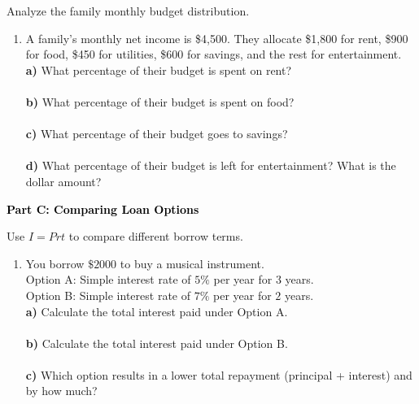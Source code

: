 \documentclass[12pt, letterpaper, fleqn]{article}
\newcommand{\blanklong}{\underline{\hspace{6.5cm}}}
\begin{document}
\noindent
Analyze the family monthly budget distribution.

\vspace{5mm}

\begin{enumerate}[itemsep=2.5cm, leftmargin=0.6cm]
\item A family's monthly net income is \$4,500. They allocate \$1,800 for rent, \$900 for food, \$450 for utilities, \$600 for savings, and the rest for entertainment. \\
\textbf{a)} What percentage of their budget is spent on rent? \\
\blanklong \\
\textbf{b)} What percentage of their budget is spent on food? \\
\blanklong \\
\textbf{c)} What percentage of their budget goes to savings? \\
\blanklong \\
\textbf{d)} What percentage of their budget is left for entertainment? What is the dollar amount? \\
\blanklong
\end{enumerate}

\newpage

\begin{tcolorbox}[colback=black!10]
    \large\textcolor{black}{\textbf{Part C: Comparing Loan Options}}
\end{tcolorbox}

\vspace{3mm}

\noindent
Use $I = Prt$ to compare different borrow terms.

\vspace{5mm}

\begin{enumerate}[itemsep=2.5cm, leftmargin=0.6cm]
\item You borrow $\$2000$ to buy a musical instrument. \\
Option A: Simple interest rate of $5\%$ per year for $3$ years. \\
Option B: Simple interest rate of $7\%$ per year for $2$ years. \\
\textbf{a)} Calculate the total interest paid under Option A. \\
\blanklong \\
\textbf{b)} Calculate the total interest paid under Option B. \\
\blanklong \\
\textbf{c)} Which option results in a lower total repayment (principal + interest) and by how much? \\
\blanklong
\end{enumerate}
\end{document}
